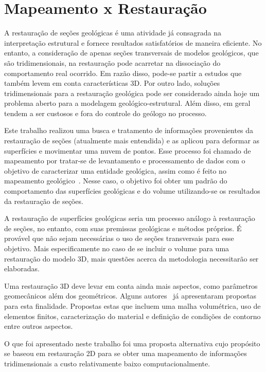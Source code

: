 \section{Mapeamento x Restauração}

A restauração de seções geológicas é uma atividade já consagrada na interpretação estrutural e fornece resultados satisfatórios de maneira eficiente. No entanto, a consideração de apenas seções transversais de modelos geológicos, que são tridimensionais, na restauração pode acarretar na dissociação do comportamento real ocorrido. Em razão disso, pode-se partir a estudos que também levem em conta características 3D. Por outro lado, soluções tridimensionais para a restauração geológica pode ser considerado ainda hoje um problema aberto para a modelagem geológico-estrutural. Além disso, em geral tendem a ser custosos e fora do controle do geólogo no processo.

Este trabalho realizou uma busca e tratamento de informações provenientes da restauração de seções (atualmente mais entendida) e as aplicou para deformar as superfícies e movimentar uma nuvem de pontos. Esse processo foi chamado de mapeamento por tratar-se de levantamento e processamento de dados com o objetivo de caracterizar uma entidade geológica, assim como é feito no mapeamento geológico~\cite{Geoscan}. Nesse caso, o objetivo foi obter um padrão do comportamento das superfícies geológicas e do volume utilizando-se os resultados da restauração de seções.

A restauração de superfícies geológicas seria um processo análogo à restauração de seções, no entanto, com suas premissas geológicas e métodos próprios. É provável que não sejam necessárias o uso de seções transversais para esse objetivo. Mais especificamente no caso de se incluir o volume para uma restauração do modelo 3D, mais questões acerca da metodologia necessitarão ser elaboradas. 

Uma restauração 3D deve levar em conta ainda mais aspectos, como parâmetros geomecânicos além dos geométricos. Alguns autores~\cite{Santi_3dgeological, Massot, DURANDRIARD2010441} já apresentaram propostas para esta finalidade. Propostas estas que incluem uma malha volumétrica, uso de elementos finitos, caracterização do material e definição de condições de contorno entre outros aspectos.

O que foi apresentado neste trabalho foi uma proposta alternativa cujo propósito se baseou em restauração 2D para se obter uma mapeamento de informações tridimensionais a custo relativamente baixo computacionalmente.

